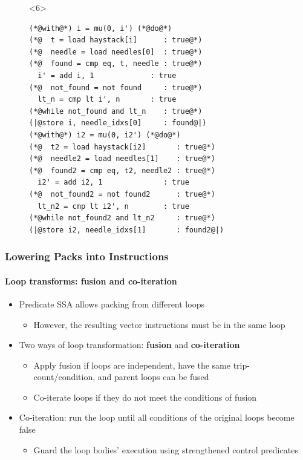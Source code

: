 \documentclass[aspectratio=169]{beamer}
\begin{document}
\begin{frame}[fragile]
\begin{figure}
\begin{onlyenv}
    \end{onlyenv}%
    \begin{onlyenv}<6>
      \begin{minipage}{0.45\textwidth}
        \begin{lstlisting}
(*@with@*) i = mu(0, i') (*@do@*)
(*@  t = load haystack[i]      : true@*)
(*@  needle = load needles[0]  : true@*)
(*@  found = cmp eq, t, needle : true@*)
  i' = add i, 1             : true
(*@  not_found = not found     : true@*)
  lt_n = cmp lt i', n       : true
(*@while not_found and lt_n    : true@*)
(|@store i, needle_idxs[0]     : found@|)
(*@with@*) i2 = mu(0, i2') (*@do@*)
(*@  t2 = load haystack[i2]       : true@*)
(*@  needle2 = load needles[1]    : true@*)
(*@  found2 = cmp eq, t2, needle2 : true@*)
  i2' = add i2, 1              : true
(*@  not_found2 = not found2      : true@*)
  lt_n2 = cmp lt i2', n        : true
(*@while not_found2 and lt_n2     : true@*)
(|@store i2, needle_idxs[1]       : found2@|)
        \end{lstlisting}
      \end{minipage}
    \end{onlyenv}%
  \end{figure}
\end{frame}

\begin{frame}
  \frametitle{Lowering Packs into Instructions}
  \framesubtitle{Loop transforms: fusion and co-iteration}

  \begin{itemize}
    \item Predicate SSA allows packing from different loops
    \begin{itemize}
      \item However, the resulting vector instructions must be in the same loop
    \end{itemize}
    \pause
    \item Two ways of loop transformation: {\bfseries fusion} and {\bfseries co-iteration}
    \begin{itemize}
      \item Apply fusion if loops are independent, have the same trip-count/condition, and parent loops can be fused
      \item Co-iterate loops if they do not meet the conditions of fusion
    \end{itemize}
    \pause
    \item Co-iteration: run the loop until all conditions of the original loops become false
    \begin{itemize}
      \item Guard the loop bodies' execution using strengthened control predicates
    \end{itemize}
  \end{itemize}
\end{frame}
\end{document}
